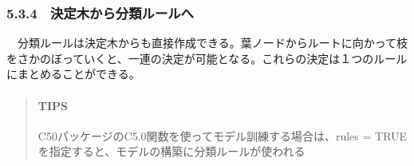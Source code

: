 \documentclass[
]{article}
\begin{document}
\subsubsection{5.3.4　決定木から分類ルールへ}\label{ux6c7aux5b9aux6728ux304bux3089ux5206ux985eux30ebux30fcux30ebux3078}

　分類ルールは決定木からも直接作成できる。葉ノードからルートに向かって枝をさかのぼっていくと、一連の決定が可能となる。これらの決定は１つのルールにまとめることができる。

\begin{quote}
\mbox{}%
\paragraph{TIPS}\label{sec-tips}

C50パッケージのC5.0関数を使ってモデル訓練する場合は、rules = TRUE
を指定すると、モデルの構築に分類ルールが使われる
\end{quote}
\end{document}

